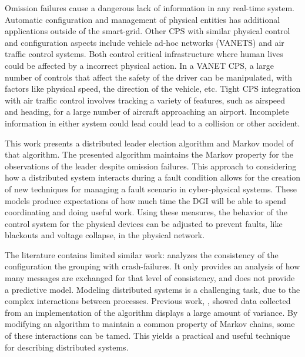Omission failures cause a dangerous lack of information in any real-time system.
Automatic configuration and management of physical entities has additional applications outside of the smart-grid.
Other CPS with similar physical control and configuration aspects include vehicle ad-hoc networks (VANETS)\cite{CARS1}\cite{CARS2} and air traffic control systems\cite{AIRTRAFFIC1}.
Both control critical infrastructure where human lives could be affected by a incorrect physical action.
In a VANET CPS, a large number of controls that affect the safety of the driver can be manipulated, with factors like physical speed, the direction of the vehicle, etc.
Tight CPS integration with air traffic control involves tracking a variety of features, such as airspeed and heading, for a large number of aircraft approaching an airport\cite{AIRTRAFFIC2}.
Incomplete information in either system could lead could lead to a collision or other accident.

This work presents a distributed leader election algorithm and Markov model of that algorithm.
The presented algorithm maintains the Markov property for the observations of the leader despite omission\cite{OMISSIONFAILURES} failures.
This approach to considering how a distributed system interacts during a fault condition allows for the creation of new techniques for managing a fault scenario in cyber-physical systems.
These models produce expectations of how much time the DGI will be able to spend coordinating and doing useful work.
Using these measures, the behavior of the control system for the physical devices can be adjusted to prevent faults, like blackouts and voltage collapse, in the physical network.

The literature contains limited similar work: \cite{LEADERELECTIONEVAL} analyzes the consistency of the configuration the grouping with crash-failures.
It only provides an analysis of how many messages are exchanged for that level of consistency, and does not provide a predictive model.
Modeling distributed systems is a challenging task, due to the complex interactions between processes.
Previous work, \cite{CRITIS2012}, showed data collected from an implementation of the algorithm displays a large amount of variance.
By modifying an algorithm to maintain a common property of Markov chains, some of these interactions can be tamed.
This yields a practical and useful technique for describing distributed systems.
